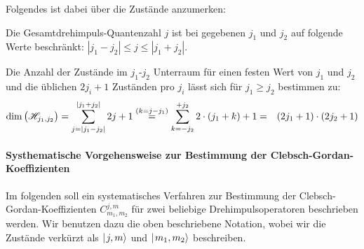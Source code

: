 Folgendes ist dabei über die Zustände anzumerken: 
\begin{itemize1}
	\item Die Gesamtdrehimpuls-Quantenzahl $j$ ist bei gegebenen $j_1$ und $j_2$ auf folgende Werte beschränkt: $|j_1-j_2|\leq j \leq |j_1 + j_2|$. 
	\item Die Anzahl der Zustände im $j_1$-$j_2$ Unterraum für einen festen Wert von $j_1$ und $j_2$ und die üblichen $2j_i+1$ Zuständen pro $j_i$ lässt sich für $j_1\geq j_2$ bestimmen zu: 
	\begin{eqnarray*}
	\dim\big(\mathscr H_{j_1,j_2}\big) = \sum_{j=|j_1-j_2|}^{|j_1+j_2|} 2j+1 \overset{(k=j-j_1)}= \sum_{k =-j_2}^{+j_2} 2\cdot(j_1 + k)+1 &=& (2j_1 +1)\cdot(2j_2+1)
	\end{eqnarray*}
\end{itemize1}

\paragraph{Systhematische Vorgehensweise zur Bestimmung der Clebsch-Gordan-Koeffizienten}

Im folgenden soll ein systematisches Verfahren zur Bestimmung der Clebsch-Gordan-Koeffizienten $C_{m_1,m_2}^{j,m}$ für zwei beliebige Drehimpulsoperatoren beschrieben werden. Wir benutzen dazu die oben beschriebene Notation, wobei wir die Zustände verkürzt als $\mid\!\!\!\,\,{j,m}\rangle$ und $\mid\!\!\!\,\,{m_1,m_2}\rangle$ beschreiben. 

